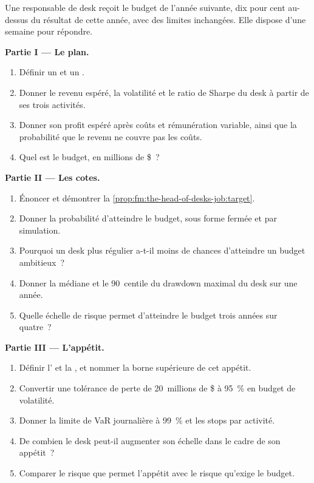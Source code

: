 \begin{problem}\label{pb:fm:the-head-of-desks-job:1}
Une responsable de desk reçoit le budget de l'année suivante, dix pour cent au-dessus du résultat de cette année, avec des limites inchangées. Elle dispose d'une semaine pour répondre.

\medskip\noindent\textbf{Partie I --- Le plan.}
\begin{enumerate}
\item Définir un  et un .
\item Donner le revenu espéré, la volatilité et le ratio de Sharpe du desk à partir de ses trois activités.
\item Donner son profit espéré après coûts et rémunération variable, ainsi que la probabilité que le revenu ne couvre pas les coûts.
\item Quel est le budget, en millions de \$~?
\end{enumerate}

\medskip\noindent\textbf{Partie II --- Les cotes.}
\begin{enumerate}[resume]
\item Énoncer et démontrer la \cref{prop:fm:the-head-of-desks-job:target}.
\item Donner la probabilité d'atteindre le budget, sous forme fermée et par simulation.
\item Pourquoi un desk plus régulier a-t-il moins de chances d'atteindre un budget ambitieux~?
\item Donner la médiane et le 90~centile du drawdown maximal du desk sur une année.
\item Quelle échelle de risque permet d'atteindre le budget trois années sur quatre~?
\end{enumerate}

\medskip\noindent\textbf{Partie III --- L'appétit.}
\begin{enumerate}[resume]
\item Définir l' et la , et nommer la borne supérieure de cet appétit.
\item Convertir une tolérance de perte de 20~millions de \$ à 95~\% en budget de volatilité.
\item Donner la limite de VaR journalière à 99~\% et les stops par activité.
\item De combien le desk peut-il augmenter son échelle dans le cadre de son appétit~?
\item Comparer le risque que permet l'appétit avec le risque qu'exige le budget.
\end{enumerate}


\end{problem}
